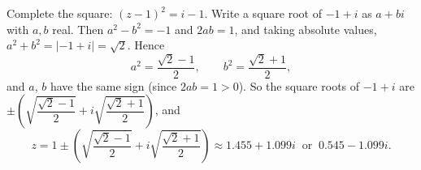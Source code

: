 Complete the square: $(z-1)^2=i-1$. Write a square root of $-1+i$ as $a+bi$ with $a,b$ real. Then $a^2-b^2=-1$ and $2ab=1$, and taking absolute values, $a^2+b^2=\left|-1+i\right|=\sqrt2$. Hence
\[a^2=\dfrac{\sqrt2-1}{2},\qquad b^2=\dfrac{\sqrt2+1}{2},\]
and $a$, $b$ have the same sign (since $2ab=1>0$). So the square roots of $-1+i$ are $\pm\left(\sqrt{\dfrac{\sqrt2-1}{2}}+i\sqrt{\dfrac{\sqrt2+1}{2}}\right)$, and
\[\boxed{z=1\pm\left(\sqrt{\dfrac{\sqrt2-1}{2}}+i\sqrt{\dfrac{\sqrt2+1}{2}}\right)}\approx1.455+1.099i\ \text{ or }\ 0.545-1.099i .\]
